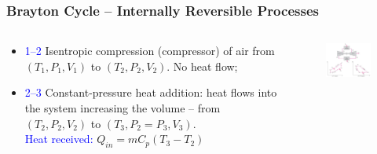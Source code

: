 \documentclass[10pt,compress]{beamer}
\begin{document}
\begin{frame}
 \frametitle{Brayton Cycle -- Internally Reversible Processes}
 \begin{columns}
  \begin{column}[c]{0.4\linewidth} 
   \begin{itemize}
    \item <1-> \textcolor{blue}{1--2} Isentropic compression (compressor) of air from $\left(T_{1},P_{1},V_{1}\right)$ to $\left(T_{2},P_{2},V_{2}\right)$. No heat flow;
    \item <2-> \textcolor{blue}{2--3} Constant-pressure heat addition: heat flows into the system increasing the volume -- from $\left(T_{2},P_{2},V_{2}\right)$ to $\left(T_{3},P_{2}=P_{3},V_{3}\right)$.  \\
\textcolor{blue}{Heat received:} $Q_{in}=mC_{p}\left(T_{3}-T_{2}\right)$
   \end{itemize}
  \end{column}
  \begin{column}[c]{0.6\linewidth}
    \begin{center}
   \begin{figure}%
     \includegraphics[height=6.cm,width=6.5cm,clip]{./Pics/Brayton_cycle1}
   \end{figure}  
    \end{center}
  \end{column}  
 \end{columns}
\end{frame}
\end{document}
